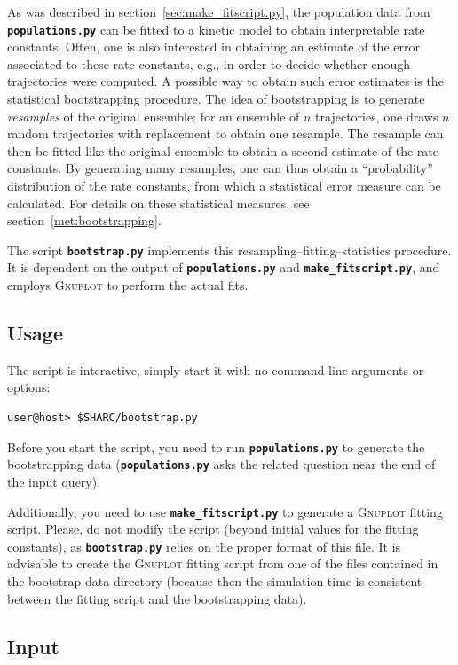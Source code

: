 \documentclass[a4paper,10pt,DIV=15,openany]{scrbook}
\newcommand{\ttt}[1]{\textbf{\texttt{#1}}}
\begin{document}
As was described in section~\ref{sec:make_fitscript.py}, the population data from \ttt{populations.py} can be fitted to a kinetic model to obtain interpretable rate constants.
Often, one is also interested in obtaining an estimate of the error associated to these rate constants, e.g., in order to decide whether enough trajectories were computed.
A possible way to obtain such error estimates is the statistical bootstrapping procedure.
The idea of bootstrapping is to generate \emph{resamples} of the original ensemble; for an ensemble of $n$ trajectories, one draws $n$ random trajectories with replacement to obtain one resample.
The resample can then be fitted like the original ensemble to obtain a second estimate of the rate constants. 
By generating many resamples, one can thus obtain a ``probability'' distribution of the rate constants, from which a statistical error measure can be calculated.
For details on these statistical measures, see section~\ref{met:bootstrapping}.

The script \ttt{bootstrap.py} implements this resampling--fitting--statistics procedure.
It is dependent on the output of \ttt{populations.py} and \ttt{make\_fitscript.py}, and employs \textsc{Gnuplot} to perform the actual fits.

\subsection{Usage}

The script is interactive, simply start it with no command-line arguments or options:
\begin{verbatim}
user@host> $SHARC/bootstrap.py
\end{verbatim}

Before you start the script, you need to run \ttt{populations.py} to generate the bootstrapping data (\ttt{populations.py} asks the related question near the end of the input query).

Additionally, you need to use \ttt{make\_fitscript.py} to generate a \textsc{Gnuplot} fitting script. Please, do not modify the script (beyond initial values for the fitting constants), as \ttt{bootstrap.py} relies on the proper format of this file.
It is advisable to create the \textsc{Gnuplot} fitting script from one of the files contained in the bootstrap data directory (because then the simulation time is consistent between the fitting script and the bootstrapping data).

\subsection{Input}
\end{document}

